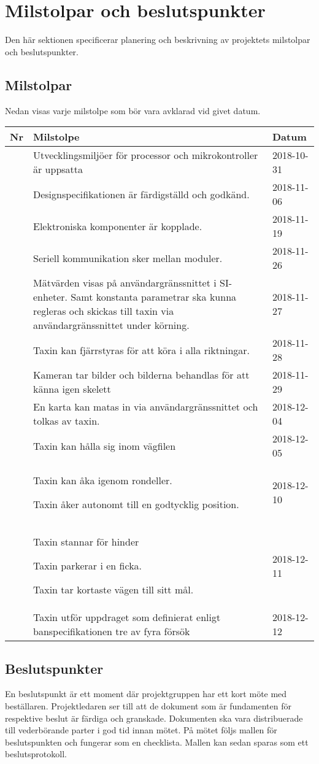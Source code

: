 \documentclass[projektplan/plan.tex]{subfiles}
\newcounter{milestoneNo} %
\newenvironment{milestonelist}
{
    \setlength{\tabcolsep}{12pt}
    \renewcommand{\arraystretch}{1.6}
    \begin{longtable}{p{8mm}p{105mm}p{25mm}}
        \bfseries Nr &
        \bfseries Milstolpe &
        \bfseries Datum 
	\\\hline\endhead
}{
    \end{longtable}
}
\newcommand{\milestone}[2]{
    \stepcounter{milestoneNo}
    \arabic{milestoneNo} & #1     & #2 \\
}
\begin{document}
\section{Milstolpar och beslutspunkter}
Den här sektionen specificerar planering och beskrivning av projektets milstolpar
och beslutspunkter.

\subsection{Milstolpar}
Nedan visas varje milstolpe som bör vara avklarad vid givet datum.
\begin{milestonelist}
    \milestone{Utvecklingsmiljöer för processor och mikrokontroller är
    uppsatta}{2018-10-31}
    \milestone{Designspecifikationen är färdigställd och godkänd.}{2018-11-06}
    \milestone{Elektroniska komponenter är kopplade.}{2018-11-19}
    \milestone{Seriell kommunikation sker mellan moduler.}{2018-11-26}
    \milestone{Mätvärden visas på användargränssnittet i
    SI-enheter. Samt konstanta parametrar ska kunna regleras och skickas till taxin via
    användargränssnittet under körning.}{2018-11-27}
    \milestone{Taxin kan fjärrstyras för att köra i alla
    riktningar.}{2018-11-28}
    \milestone{Kameran tar bilder och bilderna behandlas för att känna igen
    skelett}{2018-11-29}
    \milestone{En karta kan matas in via användargränssnittet och tolkas av
    taxin.}{2018-12-04}
    \milestone{Taxin kan hålla sig inom vägfilen}{2018-12-05}

    \milestone{Taxin kan åka igenom rondeller.

    Taxin åker autonomt till en godtycklig position.}{2018-12-10}

    \milestone{Taxin stannar för hinder
    
    Taxin parkerar i en ficka.

    Taxin tar kortaste vägen till sitt mål.}{2018-12-11}

    \milestone{Taxin utför uppdraget som definierat enligt banspecifikationen
    tre av fyra försök}{2018-12-12}
\end{milestonelist}

\subsection{Beslutspunkter}
En beslutspunkt är ett moment där projektgruppen har ett kort möte med
beställaren. Projektledaren ser till att de dokument som är fundamenten för
respektive beslut är färdiga och granskade. Dokumenten ska vara distribuerade
till vederbörande parter i god tid innan mötet. På mötet följs mallen för
beslutspunkten och fungerar som en checklista. Mallen kan sedan sparas som ett
beslutsprotokoll.
\end{document}
